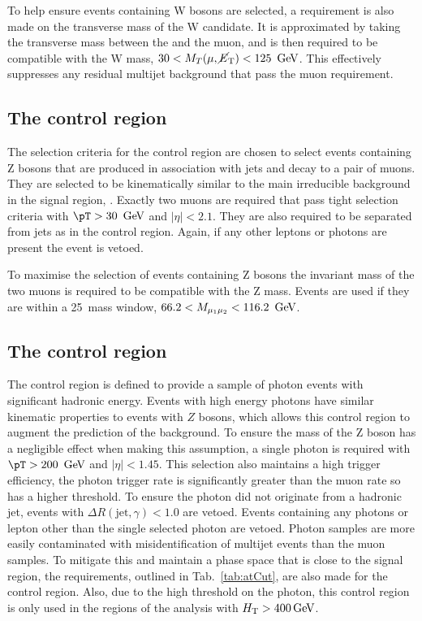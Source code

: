 To help ensure events containing W bosons are selected, a requirement
is also made on the transverse mass of the W candidate. It is
approximated by taking the transverse mass between the \MET and the
muon, and is then required to be compatible with the W mass,
$30<M_T(\mu,\mbox{$\cancel{E}_\text{T}$})<125~\mathrm{\,Ge\kern -0.1em V}$. This effectively suppresses any residual
\QCD multijet background that pass the muon requirement.

\subsection{The \mmj control region}

The selection criteria for the \mmj control region are chosen to
select events containing Z bosons that are produced in association
with jets and decay to a pair of muons. They are selected to be
kinematically similar to the main irreducible background in the signal
region, \znunu. Exactly two muons are required that
pass tight selection criteria with $\pT>30~\gev$ and $|\eta|<2.1$.
They are also required to be separated from jets as in the \mj control
region. Again, if any other leptons or photons are present the event
is vetoed.

To maximise the selection of events containing Z bosons the
invariant mass of the two muons is required to be compatible with the
Z mass. Events are used if they are within a 25~\gev mass window,
$66.2<M_{\mu_1\mu_2}<116.2~\mathrm{\,Ge\kern -0.1em V}$.

\subsection{The \gj control region}

The \gj control region is defined to provide a sample of photon events
with significant hadronic energy. Events with high energy photons have similar
kinematic properties to events with $Z$ bosons, which allows this control region
to augment the prediction of the \znunu background. To
ensure the mass of the Z boson has a negligible effect when making
this assumption, a single photon is required with $\pT>200~\gev$ and
$|\eta|<1.45$. This selection also maintains a high trigger
efficiency, the photon trigger rate is significantly greater than the
muon rate so has a higher \pT threshold. To ensure the photon did not
originate from a hadronic jet, events with $\Delta
R(\mathrm{jet},\gamma)<1.0$ are vetoed. Events containing any photons
or lepton other than the single selected photon are vetoed. Photon
samples are more easily contaminated with misidentification of \QCD
multijet events than the muon samples. To mitigate this and maintain a
phase space that is close to the signal region, the \alphat
requirements, outlined in Tab.~\ref{tab:atCut}, are also made for the \gj
control region. Also, due to the high \pT threshold on the photon,
this control region is only used in the regions of the analysis with
$\mbox{$H_\text{T}$}>400\mathrm{\,Ge\kern -0.1em V}$.

